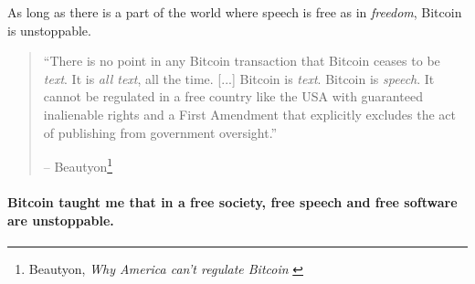 As long as there is a part of the world where speech is free as in
\textit{freedom}, Bitcoin is unstoppable.

\begin{quotation}\begin{samepage}
\enquote{There is no point in any Bitcoin transaction that Bitcoin ceases to be
\textit{text}. It is \textit{all text}, all the time. [...] Bitcoin is
\textit{text}. Bitcoin is \textit{speech}. It cannot be regulated in a free
country like the USA with guaranteed inalienable rights and a First Amendment
that explicitly excludes the act of publishing from government oversight.}
\begin{flushright} -- Beautyon\footnote{Beautyon, \textit{Why America can't regulate
Bitcoin} \cite{america-regulate-bitcoin}}
\end{flushright}\end{samepage}\end{quotation}

\paragraph{Bitcoin taught me that in a free society, free speech and free software
are unstoppable.}

%
%
%
%
%
%
%
